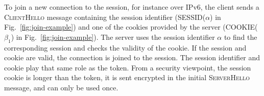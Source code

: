 To join a new \tcp connection to the \tcpls session, for instance over IPv6, the client
sends a \textsc{ClientHello} message containing the session identifier
(SESSID($\alpha$) in Fig.~\ref{fig:join-example}) and one of the
cookies provided by the server (COOKIE($\beta_1$) in Fig.~\ref{fig:join-example}). 
The server uses the session identifier $\alpha$ to find the corresponding \tcpls session
and checks the validity of the cookie. If the \tcpls session and cookie are valid, the \tcp
connection is joined to the \tcpls session. The session identifier and
cookie play that same role as the \mptcp token. From a security viewpoint, the \tcpls
session cookie is longer than the \mptcp token, it is sent encrypted
in the initial \textsc{ServerHello} message, and can only be used once.




